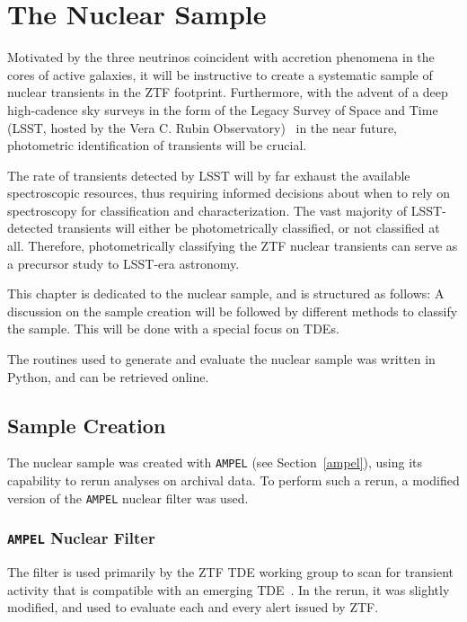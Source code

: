 \chapter{The Nuclear Sample}\label{nucsam}
Motivated by the three neutrinos coincident with accretion phenomena in the cores of active galaxies, it will be instructive to create a systematic sample of nuclear transients in the ZTF footprint. Furthermore, with the advent of a deep high-cadence sky surveys in the form of the Legacy Survey of Space and Time (LSST, hosted by the Vera C. Rubin Observatory)~ in the near future, photometric identification of transients will be crucial.

The rate of transients detected by LSST will by far exhaust the available spectroscopic resources, thus requiring informed decisions about when to rely on spectroscopy for classification and characterization. The vast majority of LSST-detected transients will either be photometrically classified, or not classified at all. Therefore, photometrically classifying the ZTF nuclear transients can serve as a precursor study to LSST-era astronomy.

This chapter is dedicated to the nuclear sample, and is structured as follows: A discussion on the sample creation will be followed by different methods to classify the sample. This will be done with a special focus on TDEs.

The routines used to generate and evaluate the nuclear sample was written in Python, and can be retrieved online.

\section{Sample Creation}
The nuclear sample was created with \texttt{AMPEL} (see Section~\ref{ampel}), using its capability to rerun analyses on archival data. To perform such a rerun, a modified version of the \texttt{AMPEL} nuclear filter was used.

\subsection{\texttt{AMPEL} Nuclear Filter}\label{nuclear_filter}

The filter is used primarily by the ZTF TDE working group to scan for transient activity that is compatible with an emerging TDE~\cite{Velzen2021a}. In the rerun, it was slightly modified, and used to evaluate each and every alert issued by ZTF.

